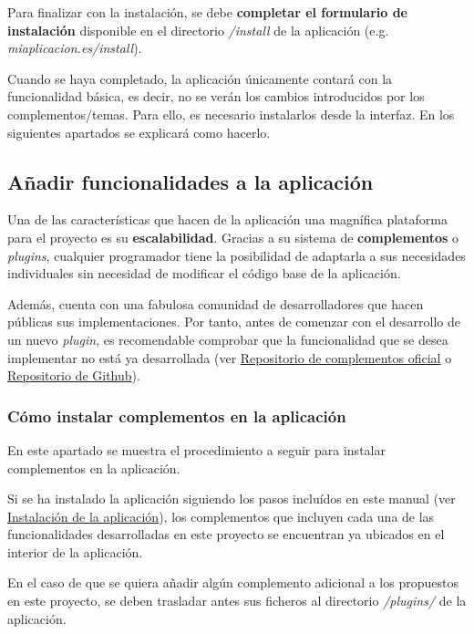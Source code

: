Para finalizar con la instalación, se debe \textbf{completar el
formulario de instalación} disponible en el directorio \emph{/install} de la
aplicación (e.g. \emph{miaplicacion.es/install}). 
 
Cuando se haya completado, la aplicación únicamente contará con la funcionalidad
básica, es decir, no se verán los cambios introducidos por los
complementos/temas. Para ello, es necesario instalarlos desde la
interfaz. En los siguientes apartados se explicará como hacerlo.

\subsection{Añadir funcionalidades a la aplicación}

Una de las características que hacen de la aplicación una magnífica
plataforma para el proyecto es su \textbf{escalabilidad}. Gracias a su
sistema de \textbf{complementos} o \emph{plugins}, cualquier programador
tiene la posibilidad de adaptarla a sus necesidades individuales sin
necesidad de modificar el código base de la aplicación.

Además, cuenta con una fabulosa comunidad de desarrolladores que hacen
públicas sus implementaciones. Por tanto, antes de comenzar con el
desarrollo de un nuevo \emph{plugin}, es recomendable comprobar que la
funcionalidad que se desea implementar no está ya desarrollada (ver
\href{https://omeka.org/classic/plugins/}{Repositorio de complementos
oficial} o
\href{https://daniel-km.github.io/UpgradeToOmekaS/omeka_plugins.html}{Repositorio
de Github}).


\subsubsection{Cómo instalar complementos en la aplicación}

En este apartado se muestra el procedimiento a seguir para instalar
complementos en la aplicación.

Si se ha instalado la aplicación siguiendo los pasos incluídos en este
manual (ver
\protect\hyperlink{instalaciuxf3n-de-la-aplicaciuxf3n}{Instalación de la
aplicación}), los complementos que incluyen cada una de las
funcionalidades desarrolladas en este proyecto se encuentran ya ubicados
en el interior de la aplicación.

En el caso de que se quiera añadir algún complemento adicional a los
propuestos en este proyecto, se deben trasladar antes sus ficheros al
directorio \emph{/plugins/} de la aplicación.

